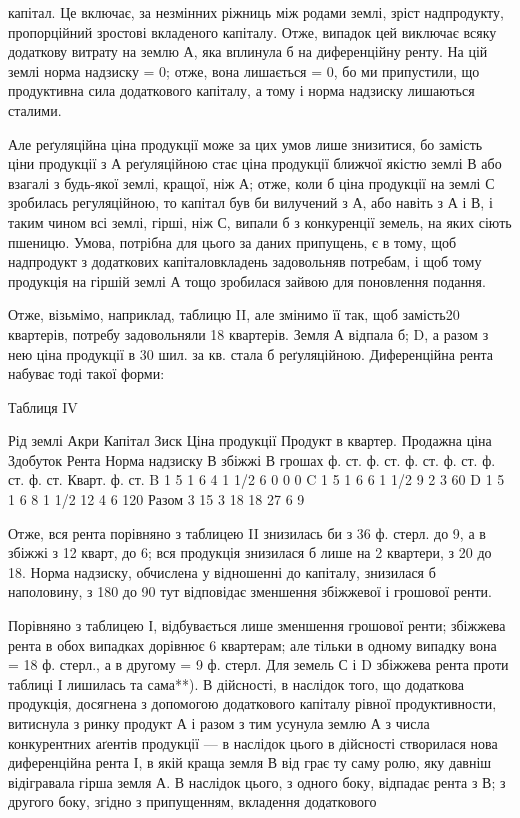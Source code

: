 капітал. Це включає, за незмінних ріжниць між родами землі, зріст надпродукту,
пропорційний зростові вкладеного капіталу. Отже, випадок цей виключає всяку
додаткову витрату на землю А, яка вплинула б на диференційну ренту. На цій землі
норма надзиску = 0; отже, вона лишається = 0, бо ми припустили, що продуктивна
сила додаткового капіталу, а тому і норма надзиску лишаються сталими.

Але реґуляційна ціна продукції може за цих умов лише знизитися, бо замість
ціни продукції з А реґуляційною стає ціна продукції ближчої якістю землі
В або взагалі з будь-якої землі, кращої, ніж А; отже, коли б ціна продукції
на землі С зробилась регуляційною, то капітал був би вилучений з А,
або навіть з А і В, і таким чином всі землі, гірші, ніж С, випали б з конкуренції
земель, на яких сіють пшеницю. Умова, потрібна для цього за даних
припущень, є в тому, щоб надпродукт з додаткових капіталовкладень задовольняв
потребам, і щоб тому продукція на гіршій землі А тощо зробилася
зайвою для поновлення подання.

Отже, візьмімо, наприклад, таблицю II, але змінимо її так, щоб замість20
квартерів, потребу задовольняли 18 квартерів. Земля А відпала б; D, а
разом з нею ціна продукції в 30 шил. за кв. стала б реґуляційною. Диференційна
рента набуває тоді такої форми:

Таблиця IV

Рід землі    Акри    Капітал    Зиск    Ціна продукції
Продукт в квартер. Продажна ціна    Здобуток    Рента    Норма надзиску
                                В збіжжі    В грошах
     ф. ст. ф. ст. ф. ст. ф. ст. ф. ст. ф. ст. Кварт. ф. ст.
B    1    5    1    6    4    1 1/2    6    0    0    0
C    1    5    1    6    6    1 1/2    9    2    3    60%
D    1    5    1    6    8    1 1/2    12    4    6    120%
 Разом    3    15    3    18    18        27    6    9

Отже, вся рента порівняно з таблицею II знизилась би з 36 ф. стерл.
до 9, а в збіжжі з 12 кварт, до 6; вся продукція знизилася б лише на 2
квартери, з 20 до 18. Норма надзиску, обчислена у відношенні до капіталу,
знизилася б наполовину, з 180 до 90%
тут відповідає зменшення збіжжевої і грошової ренти.

Порівняно з таблицею І, відбувається лише зменшення грошової ренти;
збіжжева рента в обох випадках дорівнює 6 квартерам; але тільки в одному
випадку вона = 18 ф. стерл., а в другому = 9 ф. стерл. Для земель С і D
збіжжева рента проти таблиці І лишилась та сама**). В дійсності, в наслідок
того, що додаткова продукція, досягнена з допомогою додаткового капіталу рівної
продуктивности, витиснула з ринку продукт А і разом з тим усунула землю А
з числа конкурентних аґентів продукції — в наслідок цього в дійсності створилася
нова диференційна рента І, в якій краща земля В від грає ту саму ролю,
яку давніш відігравала гірша земля А. В наслідок цього, з одного боку, відпадає
рента з В; з другого боку, згідно з припущенням, вкладення додаткового

